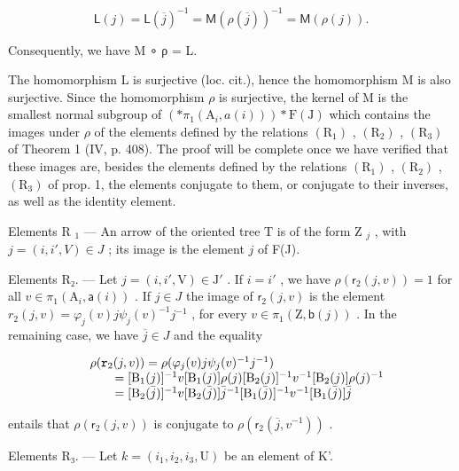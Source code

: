 \[
\mathsf {L} (j) = \mathsf {L} (\overline {{j}}) ^ {- 1} = \mathsf {M} (\rho (\overline {{j}})) ^ {- 1} = \mathsf {M} (\rho (j)).
\]

Consequently, we have M ∘ ρ = L.

The homomorphism L is surjective (loc. cit.), hence the homomorphism M is also surjective. Since the homomorphism \(\rho\) is surjective, the kernel of M is the smallest normal subgroup of \(\left(\ast\pi_{1}(\mathrm{A}_{i},a(i))\right)*\mathrm{F}(\mathrm{J})\) which contains the images under \(\rho\) of the elements defined by the relations \((\mathrm{R}_{1})\) , \((\mathrm{R}_{2})\) , \((\mathrm{R}_{3})\) of Theorem 1 (IV, p. 408). The proof will be complete once we have verified that these images are, besides the elements defined by the relations \((\mathrm{R}_{1})\) , \((\mathrm{R}_{2})\) , \((\mathrm{R}_{3})\) of prop. 1, the elements conjugate to them, or conjugate to their inverses, as well as the identity element.

Elements R \(_{1}\) --- An arrow of the oriented tree T is of the form Z \(_{j}\) , with \(j = (i, i', V) \in J\) ; its image is the element \(j\) of F(J).

Elements R₂. --- Let \(j = (i, i', \mathrm{V}) \in \mathrm{J}'\) . If \(i = i'\) , we have \(\rho(\mathsf{r}_2(j, v)) = 1\) for all \(v \in \pi_1(\mathrm{A}_i, \mathsf{a}(i))\) . If \(j \in J\) the image of \(\mathsf{r}_2(j, v)\) is the element \(r_2(j, v) = \varphi_j(v) j \psi_j(v)^{-1} j^{-1}\) , for every \(v \in \pi_1(\mathrm{Z}, \mathsf{b}(j))\) . In the remaining case, we have \(\overline{j} \in J\) and the equality

\[
\begin{array}{r l} & {\rho (\mathtt {r} _ {2} (j, v)) = \rho (\varphi_ {j} (v) j \psi_ {j} (v) ^ {- 1} j ^ {- 1})} \\ & {\qquad = [ \mathrm{B} _ {1} (j) ] ^ {- 1} v [ \mathrm{B} _ {1} (j) ] \rho (j) [ \mathrm{B} _ {2} (j) ] ^ {- 1} v ^ {- 1} [ \mathrm{B} _ {2} (j) ] \rho (j) ^ {- 1}} \\ & {\qquad = [ \mathrm{B} _ {2} (\bar {j}) ] ^ {- 1} v [ \mathrm{B} _ {2} (\bar {j}) ] \bar {j} ^ {- 1} [ \mathrm{B} _ {1} (\bar {j}) ] ^ {- 1} v ^ {- 1} [ \mathrm{B} _ {1} (\bar {j}) ] \bar {j}} \end{array}
\]

entails that \(\rho(\mathsf{r}_2(j,v))\) is conjugate to \(\rho(\mathsf{r}_2(\overline{j},v^{-1}))\) .

Elements R₃. — Let \(k = (i_{1}, i_{2}, i_{3}, \mathrm{U})\) be an element of K'.

